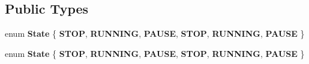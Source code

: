 \subsection*{Public Types}
\begin{DoxyCompactItemize}
\item 
\mbox{\label{classParticleSystem3D_ab8fdf94557bfcc6fb8197d125bc45148}} 
enum {\bfseries State} \{ \newline
{\bfseries S\+T\+OP}, 
{\bfseries R\+U\+N\+N\+I\+NG}, 
{\bfseries P\+A\+U\+SE}, 
{\bfseries S\+T\+OP}, 
\newline
{\bfseries R\+U\+N\+N\+I\+NG}, 
{\bfseries P\+A\+U\+SE}
 \}
\item 
\mbox{\label{classParticleSystem3D_ab8fdf94557bfcc6fb8197d125bc45148}} 
enum {\bfseries State} \{ \newline
{\bfseries S\+T\+OP}, 
{\bfseries R\+U\+N\+N\+I\+NG}, 
{\bfseries P\+A\+U\+SE}, 
{\bfseries S\+T\+OP}, 
\newline
{\bfseries R\+U\+N\+N\+I\+NG}, 
{\bfseries P\+A\+U\+SE}
 \}
\end{DoxyCompactItemize}
